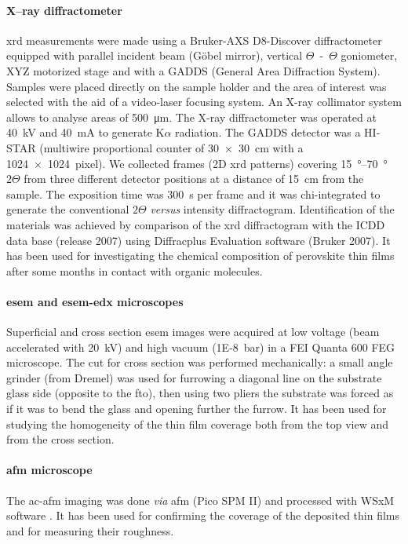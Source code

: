 		\paragraph{X--ray diffractometer}
		\gls{xrd} measurements were made using a Bruker-AXS D8-Discover diffractometer equipped with parallel incident beam (Göbel mirror), vertical $\Theta$~-~$\Theta$ goniometer, XYZ motorized stage and with a GADDS (General Area Diffraction System).
		Samples were placed directly on the sample holder and the area of interest was selected with the aid of a video-laser focusing  system.
		An X-ray collimator system allows to analyse areas of \SI{500}{\um}.
		The X-ray diffractometer was operated at \SI{40}{\kV} and \SI{40}{\mA} to generate  K$\alpha$ radiation.
		The GADDS detector was a HI-STAR (multiwire proportional counter of \SI{30x30}{\cm} with a \SI{1024x1024}{pixel}).
		We collected frames (2D \gls{xrd} patterns) covering \SIrange{15}{70}{\degree} $2\Theta$ from three different detector positions at a distance of \SI{15}{\cm} from the sample.
		The exposition time was \SI{300}{\s} per frame and it was chi-integrated to generate the conventional $2\Theta$ \textit{versus} intensity diffractogram.
		Identification of the materials was achieved by comparison of the \gls{xrd} diffractogram with the ICDD data base (release 2007) using Diffracplus Evaluation software (Bruker 2007).
		It has been used for investigating the chemical composition of perovskite thin films after some months in contact with organic molecules.

		\paragraph{\Acrshort{esem} and \acrshort{esem}-\acrshort{edx} microscopes}
		Superficial and cross section \gls{esem} images were acquired at low voltage (beam accelerated with \SI{20}{\kV}) and high vacuum (\SI{1E-8}{\bar}) in a FEI Quanta 600 FEG microscope.
		The cut for cross section was performed mechanically: a small angle grinder (from Dremel) was used for furrowing a diagonal line on the substrate glass side (opposite to the \gls{fto}), then using two pliers the substrate was forced as if it was to bend the glass and opening further the furrow.
		It has been used for studying the homogeneity of the thin film coverage both from the top view and from the cross section.

		\paragraph{\Acrshort{afm} microscope}
		The \acrfull{ac-afm} imaging was done \textit{via} \gls{afm} (Pico SPM II) and processed with WSxM software \cite{Horcas2007}.
		It has been used for confirming the coverage of the deposited thin films and for measuring their roughness.

